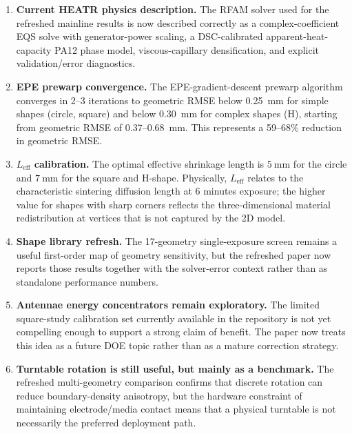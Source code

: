 \documentclass[5p,times]{elsarticle}
\newcommand{\Leff}{L_{\mathrm{eff}}}
\begin{document}
\begin{enumerate}

\item \textbf{Current HEATR physics description.}  The RFAM solver used
      for the refreshed mainline results is now described correctly as
      a complex-coefficient EQS solve with generator-power scaling, a
      DSC-calibrated apparent-heat-capacity PA12 phase model,
      viscous-capillary densification, and explicit validation/error
      diagnostics.

\item \textbf{EPE prewarp convergence.}  The EPE-gradient-descent
      prewarp algorithm converges in 2--3 iterations to geometric RMSE
      below \SI{0.25}{\milli\meter} for simple shapes (circle, square)
      and below \SI{0.30}{\milli\meter} for complex shapes (H), starting
      from geometric RMSE of 0.37--\SI{0.68}{\milli\meter}.  This
      represents a 59--68\% reduction in geometric RMSE.

\item \textbf{$\Leff$ calibration.}  The optimal effective shrinkage
      length is $\SI{5}{\milli\meter}$ for the circle and
      $\SI{7}{\milli\meter}$ for the square and H-shape.  Physically,
      $\Leff$ relates to the characteristic sintering diffusion length
      at 6 minutes exposure; the higher value for shapes with sharp
      corners reflects the three-dimensional material redistribution
      at vertices that is not captured by the 2D model.

\item \textbf{Shape library refresh.}  The 17-geometry single-exposure
      screen remains a useful first-order map of geometry sensitivity,
      but the refreshed paper now reports those results together with
      the solver-error context rather than as standalone performance
      numbers.

\item \textbf{Antennae energy concentrators remain exploratory.}  The
      limited square-study calibration set currently available in the
      repository is not yet compelling enough to support a strong claim
      of benefit.  The paper now treats this idea as a future DOE topic
      rather than as a mature correction strategy.

\item \textbf{Turntable rotation is still useful, but mainly as a
      benchmark.}  The refreshed multi-geometry comparison confirms that
      discrete rotation can reduce boundary-density anisotropy, but the
      hardware constraint of maintaining electrode/media contact means
      that a physical turntable is not necessarily the preferred
      deployment path.


\end{enumerate}
\end{document}
